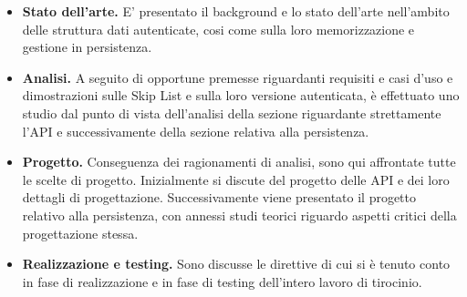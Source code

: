 		\begin{itemize}
			\item \textbf{Stato dell'arte.} E' presentato il background e lo stato dell'arte nell'ambito delle struttura dati autenticate, cosi come sulla loro memorizzazione e gestione in persistenza.
			\item \textbf{Analisi.} A seguito di opportune premesse riguardanti requisiti e casi d'uso e dimostrazioni sulle Skip List e sulla loro versione autenticata, è effettuato uno studio dal punto di vista dell'analisi della sezione riguardante strettamente l'API e successivamente della sezione relativa alla persistenza.
			\item \textbf{Progetto.} Conseguenza dei ragionamenti di analisi, sono qui affrontate tutte le scelte di progetto. Inizialmente si discute del progetto delle API e dei loro dettagli di progettazione. Successivamente viene presentato il progetto relativo alla persistenza, con annessi studi teorici riguardo aspetti critici della progettazione stessa.
			\item \textbf{Realizzazione e testing.} Sono discusse le direttive di cui si è tenuto conto in fase di realizzazione e in fase di testing dell'intero lavoro di tirocinio.
			
		\end{itemize}